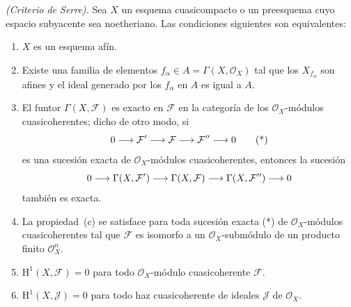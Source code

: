 \documentclass[oneside,10pt]{amsart}
\makeatletter
\newcommand{\ega@arrow}[2]{\mathchoice{#1}{#2}{#2}{#2}}
\renewcommand{\to}{\ega@arrow{\longrightarrow}{\rightarrow}}
\let\EGAOriginalLabel\label
\renewcommand{\label}[1]{\phantomsection\EGAOriginalLabel{#1}}
\makeatother
\begin{document}
\begin{theorem}[5.2.1]
\label{II.5.2.1-fr}
\emph{(Criterio de Serre).}
Sea $X$ un esquema cuasicompacto o un preesquema cuyo espacio subyacente sea noetheriano.
Las condiciones siguientes son equivalentes:
\begin{enumerate}
  \item[{\rm(a)}] $X$ es un esquema afín.
  \item[{\rm(b)}] Existe una familia de elementos $f_\alpha\in A=\Gamma(X,\mathcal{O}_X)$ tal que los $X_{f_\alpha}$ son afines y el ideal generado por los $f_\alpha$ en $A$ es igual a $A$.
  \item[{\rm(c)}] El funtor $\Gamma(X,\mathcal{F})$ es exacto en $\mathcal{F}$ en la categoría de los $\mathcal{O}_X$-módulos cuasicoherentes; dicho de otro modo, si
    \[
    0\to\mathcal{F}'\to\mathcal{F}\to\mathcal{F}''\to0 \tag{*}
  \]
    es una sucesión exacta de $\mathcal{O}_X$-módulos cuasicoherentes, entonces la sucesión
    \[
    0\to\Gamma(X,\mathcal{F}')\to\Gamma(X,\mathcal{F})
      \to\Gamma(X,\mathcal{F}'')\to0
  \]
    también es exacta.
  \item[{\rm(c')}] La propiedad~{\rm(c)} se satisface para toda sucesión exacta \textup{(*)} de $\mathcal{O}_X$-módulos cuasicoherentes tal que $\mathcal{F}$ es isomorfo a un $\mathcal{O}_X$-submódulo de un producto finito $\mathcal{O}_X^n$.
  \item[{\rm(d)}] $\mathrm{H}^1(X,\mathcal{F})=0$ para todo $\mathcal{O}_X$-módulo cuasicoherente $\mathcal{F}$.
  \item[\rm{d')}] $\mathrm{H}^1(X,\mathcal{J})=0$ para todo haz cuasicoherente de ideales $\mathcal{J}$ de $\mathcal{O}_X$.
\end{enumerate}
\end{theorem}
\end{document}
